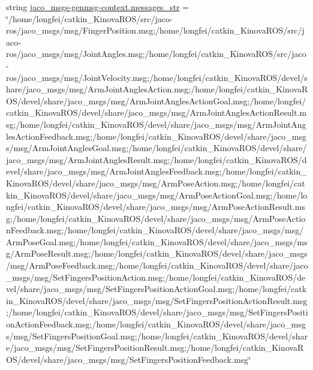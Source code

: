 \begin{DoxyCompactItemize}
string \hyperlink{namespacejaco__msgs-genmsg-context_ad0c0ed6261db181e8c56cce39be2eec2}{jaco\+\_\+msgs-\/genmsg-\/context.\+messages\+\_\+str} = \char`\"{}/home/longfei/catkin\+\_\+\+Kinova\+R\+OS/src/jaco-\/ros/jaco\+\_\+msgs/msg/Finger\+Position.\+msg;/home/longfei/catkin\+\_\+\+Kinova\+R\+OS/src/jaco-\/ros/jaco\+\_\+msgs/msg/Joint\+Angles.\+msg;/home/longfei/catkin\+\_\+\+Kinova\+R\+OS/src/jaco-\/ros/jaco\+\_\+msgs/msg/Joint\+Velocity.\+msg;/home/longfei/catkin\+\_\+\+Kinova\+R\+OS/devel/share/jaco\+\_\+msgs/msg/Arm\+Joint\+Angles\+Action.\+msg;/home/longfei/catkin\+\_\+\+Kinova\+R\+OS/devel/share/jaco\+\_\+msgs/msg/Arm\+Joint\+Angles\+Action\+Goal.\+msg;/home/longfei/catkin\+\_\+\+Kinova\+R\+OS/devel/share/jaco\+\_\+msgs/msg/Arm\+Joint\+Angles\+Action\+Result.\+msg;/home/longfei/catkin\+\_\+\+Kinova\+R\+OS/devel/share/jaco\+\_\+msgs/msg/Arm\+Joint\+Angles\+Action\+Feedback.\+msg;/home/longfei/catkin\+\_\+\+Kinova\+R\+OS/devel/share/jaco\+\_\+msgs/msg/Arm\+Joint\+Angles\+Goal.\+msg;/home/longfei/catkin\+\_\+\+Kinova\+R\+OS/devel/share/jaco\+\_\+msgs/msg/Arm\+Joint\+Angles\+Result.\+msg;/home/longfei/catkin\+\_\+\+Kinova\+R\+OS/devel/share/jaco\+\_\+msgs/msg/Arm\+Joint\+Angles\+Feedback.\+msg;/home/longfei/catkin\+\_\+\+Kinova\+R\+OS/devel/share/jaco\+\_\+msgs/msg/Arm\+Pose\+Action.\+msg;/home/longfei/catkin\+\_\+\+Kinova\+R\+OS/devel/share/jaco\+\_\+msgs/msg/Arm\+Pose\+Action\+Goal.\+msg;/home/longfei/catkin\+\_\+\+Kinova\+R\+OS/devel/share/jaco\+\_\+msgs/msg/Arm\+Pose\+Action\+Result.\+msg;/home/longfei/catkin\+\_\+\+Kinova\+R\+OS/devel/share/jaco\+\_\+msgs/msg/Arm\+Pose\+Action\+Feedback.\+msg;/home/longfei/catkin\+\_\+\+Kinova\+R\+OS/devel/share/jaco\+\_\+msgs/msg/Arm\+Pose\+Goal.\+msg;/home/longfei/catkin\+\_\+\+Kinova\+R\+OS/devel/share/jaco\+\_\+msgs/msg/Arm\+Pose\+Result.\+msg;/home/longfei/catkin\+\_\+\+Kinova\+R\+OS/devel/share/jaco\+\_\+msgs/msg/Arm\+Pose\+Feedback.\+msg;/home/longfei/catkin\+\_\+\+Kinova\+R\+OS/devel/share/jaco\+\_\+msgs/msg/Set\+Fingers\+Position\+Action.\+msg;/home/longfei/catkin\+\_\+\+Kinova\+R\+OS/devel/share/jaco\+\_\+msgs/msg/Set\+Fingers\+Position\+Action\+Goal.\+msg;/home/longfei/catkin\+\_\+\+Kinova\+R\+OS/devel/share/jaco\+\_\+msgs/msg/Set\+Fingers\+Position\+Action\+Result.\+msg;/home/longfei/catkin\+\_\+\+Kinova\+R\+OS/devel/share/jaco\+\_\+msgs/msg/Set\+Fingers\+Position\+Action\+Feedback.\+msg;/home/longfei/catkin\+\_\+\+Kinova\+R\+OS/devel/share/jaco\+\_\+msgs/msg/Set\+Fingers\+Position\+Goal.\+msg;/home/longfei/catkin\+\_\+\+Kinova\+R\+OS/devel/share/jaco\+\_\+msgs/msg/Set\+Fingers\+Position\+Result.\+msg;/home/longfei/catkin\+\_\+\+Kinova\+R\+OS/devel/share/jaco\+\_\+msgs/msg/Set\+Fingers\+Position\+Feedback.\+msg\char`\"{}

\end{DoxyCompactItemize}
